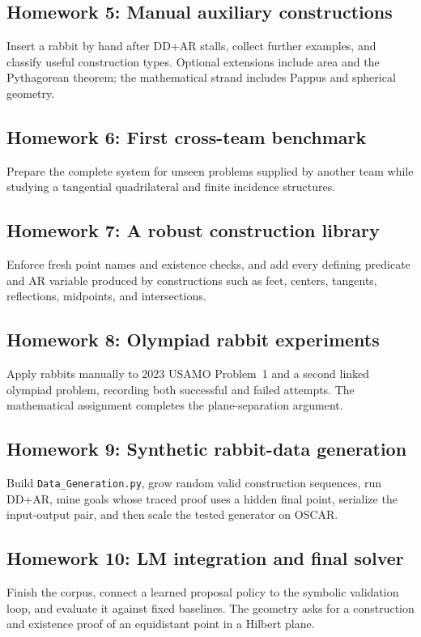 \documentclass[reqno]{amsart}
\DeclareMathOperator{\1}{\textbf{1}}
\begin{document}
\subsection{Homework 5: Manual auxiliary constructions}
Insert a rabbit by hand after DD+AR stalls, collect further examples, and
classify useful construction types. Optional extensions include area and the
Pythagorean theorem; the mathematical strand includes Pappus and spherical
geometry.

\subsection{Homework 6: First cross-team benchmark}
Prepare the complete system for unseen problems supplied by another team while
studying a tangential quadrilateral and finite incidence structures.

\subsection{Homework 7: A robust construction library}
Enforce fresh point names and existence checks, and add every defining
predicate and AR variable produced by constructions such as feet, centers,
tangents, reflections, midpoints, and intersections.

\subsection{Homework 8: Olympiad rabbit experiments}
Apply rabbits manually to 2023 USAMO Problem~1 and a second linked olympiad
problem, recording both successful and failed attempts. The mathematical
assignment completes the plane-separation argument.

\subsection{Homework 9: Synthetic rabbit-data generation}
Build \texttt{Data\_Generation.py}, grow random valid construction sequences,
run DD+AR, mine goals whose traced proof uses a hidden final point, serialize
the input-output pair, and then scale the tested generator on OSCAR.

\subsection{Homework 10: LM integration and final solver}
Finish the corpus, connect a learned proposal policy to the symbolic
validation loop, and evaluate it against fixed baselines. The geometry asks for
a construction and existence proof of an equidistant point in a Hilbert plane.
\end{document}
